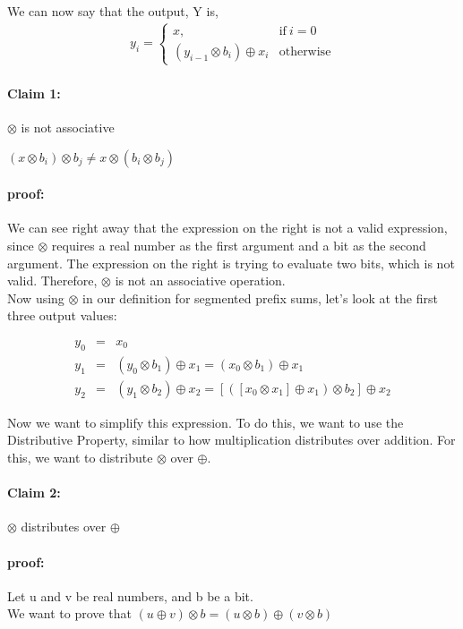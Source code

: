 \documentclass[11pt]{article}
\begin{document}
We can now say that the output, Y is,\
  \begin{eqnarray*}
    y_i =
    \begin{cases}
      x, & \text{if}\ i = 0 \\
      (y_{i-1} \otimes b_i) \oplus x_i & \text{otherwise}
    \end{cases}
  \end{eqnarray*}

\paragraph{Claim 1:} $\otimes$ is not associative

$(x \otimes b_i) \otimes b_j \neq x \otimes (b_i \otimes b_j)$

\paragraph{proof:}
We can see right away that the expression on the right is not a valid expression, since $\otimes$ requires a real number as the first argument and a bit as the second argument. The expression on the right is trying to evaluate two bits, which is not valid. Therefore, $\otimes$ is not an associative operation.\\


Now using $\otimes$ in our definition for segmented prefix sums, let’s look at the first three output values:

  \begin{eqnarray*}
    y_0 &=& x_0\\
    y_1 &=& (y_0 \otimes b_1) \oplus x_1 = (x_0 \otimes b_1) \oplus x_1\\
    y_2 &=& (y_1 \otimes b_2) \oplus x_2 = [([x_0 \otimes x_1] \oplus x_1) \otimes b_2] \oplus x_2
  \end{eqnarray*}

Now we want to simplify this expression. To do this, we want to use the Distributive Property, similar to how multiplication distributes over addition. For this, we want to distribute $\otimes$ over $\oplus$.

\paragraph{Claim 2:} $\otimes$ distributes over $\oplus$

\paragraph{proof:}
Let u and v be real numbers, and b be a bit.\\
We want to prove that $(u \oplus v) \otimes b = (u \otimes b) \oplus (v \otimes b)$
\end{document}
